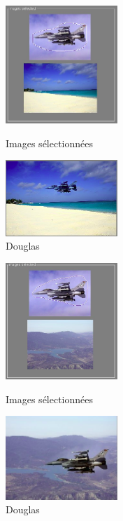 \begin{figure}[!h]
   \begin{minipage}{0.5\textwidth}
     \centering
     \includegraphics[width = 120pt]{Images/Resultats/douglas3b.png}
     \caption{Images sélectionnées}
      \end{minipage}\hfill
   \begin{minipage}{0.5\textwidth}
     \centering
     \includegraphics[width = 120pt]{Images/Resultats/douglas3.png}
     \caption{Douglas}
      \end{minipage}\hfill
\end{figure}
\begin{figure}[!htb]
   \begin{minipage}{0.5\textwidth}
     \centering
     \includegraphics[width = 120pt]{Images/Resultats/douglas4b.png}
     \caption{Images sélectionnées}
      \end{minipage}\hfill
   \begin{minipage}{0.5\textwidth}
     \centering
     \includegraphics[width = 120pt]{Images/Resultats/douglas4.png}
     \caption{Douglas}
      \end{minipage}\hfill
\end{figure}
\newpage
